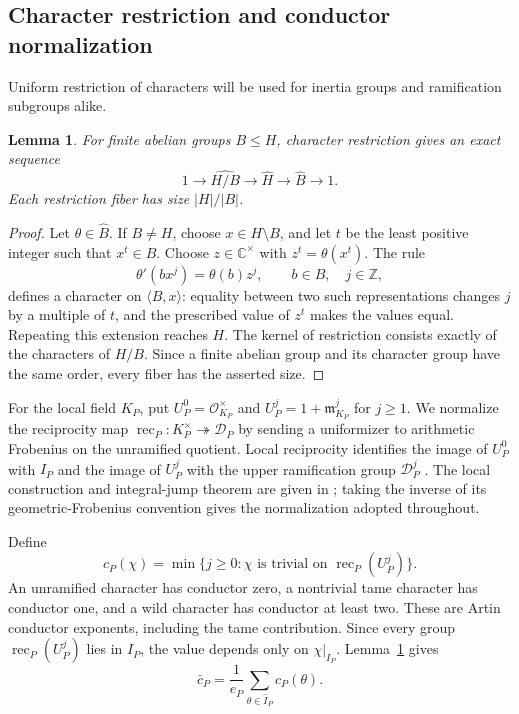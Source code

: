 \documentclass[12pt,onecolumn,draftclsnofoot,letterpaper]{IEEEtran}
\newtheorem{lemma}{Lemma}
\theoremstyle{remark}
\newcommand{\Z}{\mathbb Z}
\newcommand{\C}{\mathbb C}
\newcommand{\rec}{\operatorname{rec}}
\begin{document}
\subsection{Character restriction and conductor normalization}
Uniform restriction of characters will be used for inertia groups and ramification subgroups alike.
\begin{lemma}\label{lem:restriction}
For finite abelian groups $B\le H$, character restriction gives an exact sequence
\begin{equation}
 1\longrightarrow\widehat{H/B}\longrightarrow\widehat H
 \longrightarrow\widehat B\longrightarrow1.
 \label{eq:restriction}
\end{equation}
Each restriction fiber has size $|H|/|B|$.
\end{lemma}
\begin{proof}
Let $\theta\in\widehat B$. If $B\ne H$, choose $x\in H\setminus B$, and let $t$ be the least positive integer such that $x^t\in B$. Choose $z\in\C^\times$ with $z^t=\theta(x^t)$. The rule
\[
 \theta'(bx^j)=\theta(b)z^j,
 \qquad b\in B,\quad j\in\Z,
\]
defines a character on $\langle B,x\rangle$: equality between two such representations changes $j$ by a multiple of $t$, and the prescribed value of $z^t$ makes the values equal. Repeating this extension reaches $H$. The kernel of restriction consists exactly of the characters of $H/B$. Since a finite abelian group and its character group have the same order, every fiber has the asserted size.
\end{proof}

For the local field $K_P$, put $U_P^0=\mathcal O_{K_P}^{\times}$ and $U_P^j=1+\mathfrak m_{K_P}^j$ for $j\ge1$. We normalize the reciprocity map
$\rec_P:K_P^\times\twoheadrightarrow\mathcal D_P$ by sending a uniformizer to arithmetic Frobenius on the unramified quotient. Local reciprocity identifies the image of $U_P^0$ with $I_P$ and the image of $U_P^j$ with the upper ramification group $\mathcal D_P^j$ \cite[Th.~26(iii)]{li}. The local construction and integral-jump theorem are given in \cite[Th.~A and Th.~6.11]{yoshida}; taking the inverse of its geometric-Frobenius convention gives the normalization adopted throughout.

Define
\begin{equation}
 c_P(\chi)=\min\{j\ge0:
 \chi\text{ is trivial on }\rec_P(U_P^j)\}.
 \label{eq:conductor}
\end{equation}
An unramified character has conductor zero, a nontrivial tame character has conductor one, and a wild character has conductor at least two. These are Artin conductor exponents, including the tame contribution. Since every group $\rec_P(U_P^j)$ lies in $I_P$, the value depends only on $\chi|_{I_P}$. Lemma~\ref{lem:restriction} gives
\begin{equation}
 \bar c_P=\frac1{e_P}\sum_{\theta\in\widehat I_P}c_P(\theta).
 \label{eq:inertiamean}
\end{equation}
\end{document}
